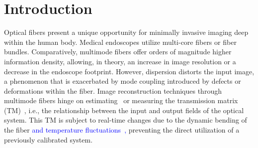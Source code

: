 \documentclass[aps,prl,twocolumn, amsmath,amssymb,superscriptaddress]{revtex4-2}
\newcommand{\blue}[1]{\textcolor{blue}{#1}}
\begin{document}
\maketitle


\section{\label{sec:intro}Introduction}


Optical fibers present a unique opportunity for minimally invasive imaging deep within the human body.
Medical endoscopes utilize multi-core fibers or fiber bundles. %
Comparatively, multimode fibers offer orders of magnitude higher information density,
allowing, in theory, an increase in image resolution or a decrease in the endoscope footprint.
However, dispersion distorts the input image, a phenomenon that is exacerbated by mode coupling
introduced by defects or deformations within the fiber.
Image reconstruction techniques through multimode fibers hinge on estimating~\cite{Ploschner2015seing} or
measuring the transmission matrix (TM)~\cite{Cizmar2012exploiting,choi2012scanner,papadopoulos2012focusing},
i.e., the relationship between the input and output fields of the optical system.
This TM is subject to real-time changes due to the dynamic bending of the fiber 
\blue{
    and temperature fluctuations~\cite{Yammine2019timeDependence},
}
preventing the direct utilization of a previously calibrated system.
\end{document}

